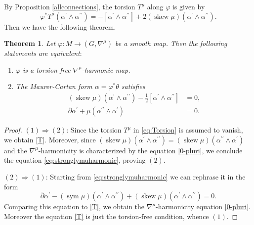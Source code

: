 \documentclass[12pt]{amsart}
\newtheorem{Theorem}{Theorem}[section]
\theoremstyle{definition}
\theoremstyle{remark}
\numberwithin{equation}{section}
\begin{document}
 By  Proposition  \ref{allconnections}, the torsion $T^{\mu}$ along 
 $\varphi$ is given by 
\begin{equation}\label{eq:Torsion}
 \varphi^* T^{\mu}(\alpha^{\prime} \wedge \alpha^{\prime \prime})
 =-[\alpha^{\prime} \wedge \alpha^{\prime \prime}] + 
 2 ({\operatorname {skew}} \mu )(\alpha^{\prime} \wedge \alpha^{\prime \prime}).
\end{equation}
 Then we have the following theorem.
\begin{Theorem}\label{thm:stronglyharmonic}
 Let  $\varphi:M\to (G,{\nabla^{\mu}})$ be a smooth map.
 Then the following statements are equivalent$:$
\begin{enumerate}
 \item $\varphi$ is a torsion free  ${\nabla^{\mu}}$-harmonic map.

 \item The Maurer-Cartan form $\alpha = \varphi ^* \theta$ satisfies
 \begin{align}
 ({\operatorname {skew}} \mu)(\alpha^\prime\wedge \alpha^{\prime\prime})
 -\frac{1}{2}[\alpha^\prime\wedge \alpha^{\prime\prime}]&=0, \label{T}\\
 \bar{\partial} \alpha^{\prime}+
 \mu(\alpha^{\prime\prime}\wedge \alpha^{\prime})&=0. \label{eq:stronglymuharmonic}
\end{align}
\end{enumerate}
\end{Theorem}
\begin{proof} 

 $(1) \Rightarrow (2)$:
 Since the torsion $T^{\mu}$ 
 in \eqref{eq:Torsion} is assumed to  vanish, we obtain \eqref{T}.
 Moreover, since $({\operatorname {skew}} \mu) (\alpha^{\prime} \wedge \alpha^{\prime \prime}) = 
 ({\operatorname {skew}} \mu) (\alpha^{\prime \prime} \wedge \alpha^{\prime})$ and 
 the ${\nabla^{\mu}}$-harmonicity is characterized by the equation 
 \eqref{0-pluri}, we conclude the equation \eqref{eq:stronglymuharmonic}, 
 proving $(2)$.

 $(2) \Rightarrow (1)$: Starting from \eqref{eq:stronglymuharmonic} 
 we can rephrase it in the form  
 \begin{equation} \label{**}
 \bar \partial \alpha^{\prime} 
 - ({\operatorname {sym}} \mu)(\alpha^{\prime} \wedge \alpha^{\prime \prime}) + 
 ({\operatorname {skew}} \mu )(\alpha^{\prime} \wedge \alpha^{\prime \prime}) =0.
 \end{equation}
 Comparing this equation to \eqref{T}, we obtain the ${\nabla^{\mu}}$-harmonicity equation 
 \eqref{0-pluri}. Moreover the equation \eqref{T} is just the torsion-free condition, 
 whence $(1)$.

\end{proof}
\end{document}
